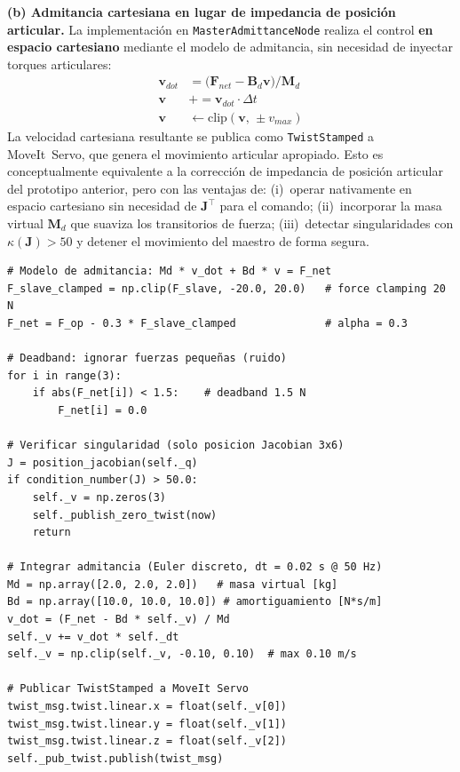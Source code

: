 \documentclass[journal,10pt,twoside]{IEEEtran}
\begin{document}
\textbf{(b) Admitancia cartesiana en lugar de impedancia de posición articular.}
La implementación en \texttt{MasterAdmittanceNode} realiza el control
\textbf{en espacio cartesiano} mediante el modelo de admitancia, sin
necesidad de inyectar torques articulares:
\begin{align*}
  \bm{v}_{dot} &= \bigl(\bm{F}_{net} - \bm{B}_d\bm{v}\bigr) / \bm{M}_d \\
  \bm{v} &\mathrel{+}= \bm{v}_{dot} \cdot \Delta t \\
  \bm{v} &\leftarrow \text{clip}(\bm{v},\, \pm v_{max})
\end{align*}
La velocidad cartesiana resultante se publica como \texttt{TwistStamped}
a MoveIt~Servo, que genera el movimiento articular apropiado.
Esto es conceptualmente equivalente a la corrección de impedancia de
posición articular del prototipo anterior, pero con las ventajas de:
(i)~operar nativamente en espacio cartesiano sin necesidad de $\bm{J}^\top$
para el comando; (ii)~incorporar la masa virtual $\bm{M}_d$ que suaviza
los transitorios de fuerza; (iii)~detectar singularidades con
$\kappa(\bm{J}) > 50$ y detener el movimiento del maestro de forma segura.

\begin{lstlisting}[caption={Admitancia del maestro — MasterAdmittanceNode (master\_node.py)},
                   label={lst:haptic}]
# Modelo de admitancia: Md * v_dot + Bd * v = F_net
F_slave_clamped = np.clip(F_slave, -20.0, 20.0)   # force clamping 20 N
F_net = F_op - 0.3 * F_slave_clamped              # alpha = 0.3

# Deadband: ignorar fuerzas pequeñas (ruido)
for i in range(3):
    if abs(F_net[i]) < 1.5:    # deadband 1.5 N
        F_net[i] = 0.0

# Verificar singularidad (solo posicion Jacobian 3x6)
J = position_jacobian(self._q)
if condition_number(J) > 50.0:
    self._v = np.zeros(3)
    self._publish_zero_twist(now)
    return

# Integrar admitancia (Euler discreto, dt = 0.02 s @ 50 Hz)
Md = np.array([2.0, 2.0, 2.0])   # masa virtual [kg]
Bd = np.array([10.0, 10.0, 10.0]) # amortiguamiento [N*s/m]
v_dot = (F_net - Bd * self._v) / Md
self._v += v_dot * self._dt
self._v = np.clip(self._v, -0.10, 0.10)  # max 0.10 m/s

# Publicar TwistStamped a MoveIt Servo
twist_msg.twist.linear.x = float(self._v[0])
twist_msg.twist.linear.y = float(self._v[1])
twist_msg.twist.linear.z = float(self._v[2])
self._pub_twist.publish(twist_msg)
\end{lstlisting}
\end{document}
